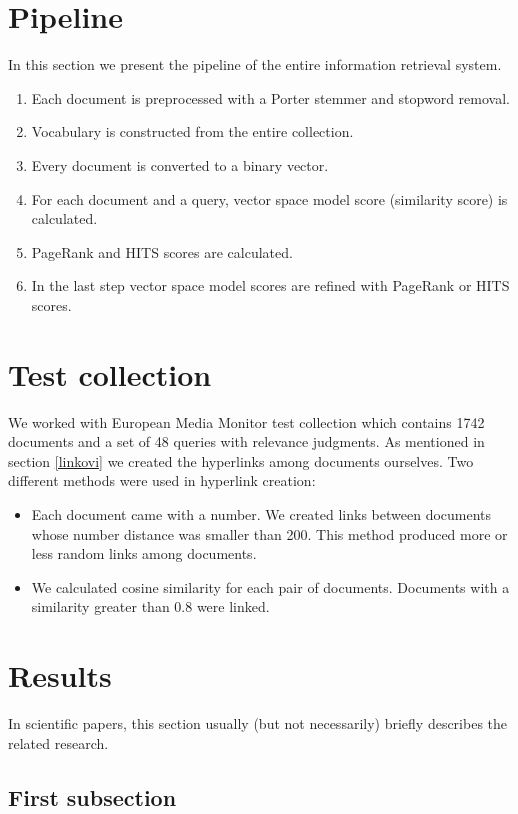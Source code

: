\documentclass[10pt, a4paper]{article}
\begin{document}
\section{Pipeline}
In this section we present the pipeline of the entire information retrieval system.

\begin{enumerate}
\item Each document is preprocessed with a Porter stemmer and stopword removal.
\item Vocabulary is constructed from the entire collection.
\item Every document is converted to a binary vector.
\item For each document and a query, vector space model score (similarity score) is calculated.
\item PageRank and HITS scores are calculated.
\item In the last step vector space model scores are refined with PageRank or HITS scores.
\end{enumerate}


\section{Test collection}
We worked with European Media Monitor test collection which contains 1742 documents and a set of 48 queries with relevance judgments. As mentioned in section \ref{linkovi} we created the hyperlinks among documents ourselves. Two different methods were used in hyperlink creation:
\begin{itemize}
\item Each document came with a number. We created links between documents whose number distance was smaller than 200. This method produced more or less random links among documents.
\item We calculated cosine similarity for each pair of documents. Documents with a similarity greater than 0.8 were linked.
\end{itemize}

\section{Results}

In scientific papers, this section usually (but not necessarily) briefly describes the related research. 

\subsection{First subsection}
\label{sec:first}
\end{document}

